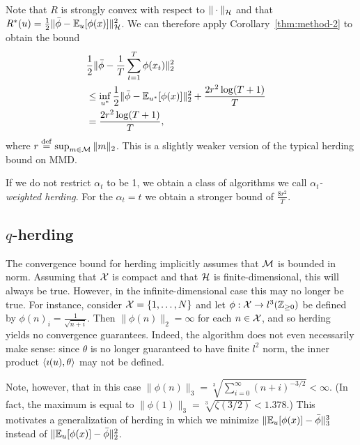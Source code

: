 \documentclass[paper.tex]{subfiles}
\begin{document}
Note that $R$ is strongly convex with respect to $\|\cdot\|_{\mathcal{H}}$ and that 
$R^*(u) = \frac{1}{2}\|\bar{\phi}-\mathbb{E}_{u}[\phi(x)]\|_{\mathcal{H}}^2$. We can 
therefore apply Corollary~\ref{thm:method-2} to obtain the bound
\begin{align*}
\lefteqn{\frac{1}{2}\|\bar{\phi}-\frac{1}{T}\sum_{t=1}^T \phi(x_t)\|_2^2} \\
 &\leq \inf_{u^*} \frac{1}{2}\|\bar{\phi}-\bE_{u^*}[\phi(x)]\|_2^2 + \frac{2r^2\log(T+1)}{T} \\
 &= \frac{2r^2\log(T+1)}{T},
\end{align*}
where $r \stackrel{\mathrm{def}}{=} \sup_{m \in \mathcal{M}} \|m\|_2$. This is a slightly weaker 
version of the typical herding bound on MMD.

If we do not restrict $\alpha_{t}$ to be 1, we obtain a class of algorithms
we call {\em $\alpha_{t}$-weighted herding}. For the $\alpha_t = t$ we obtain 
a stronger bound of $\frac{8r^2}{T}$.

\subsection{$q$-herding}
\label{sec:infinite-case}

The convergence bound for herding implicitly assumes that 
$\mathcal{M}$ is bounded in norm. Assuming that $\mathcal{X}$ is compact 
and that $\mathcal{H}$ is finite-dimensional, this will always be true. However, in 
the infinite-dimensional case this may no longer be true. 
For instance, consider $\mathcal{X} = \{1,\ldots,N\}$ and let 
$\phi : \mathcal{X} \to l^3(\mathbb{Z}_{\geq 0})$ be
defined by $\phi(n)_i = \frac{1}{\sqrt{n+i}}$. Then 
$\|\phi(n)\|_2 = \infty$ for each $n \in \mathcal{X}$, and so herding 
yields no convergence guarantees. Indeed, the algorithm 
does not even necessarily make sense: since $\theta$ is 
no longer guaranteed to have finite $l^2$ norm, the 
inner product $\left\langle \imath(u), \theta \right\rangle$ may not be defined.

Note, however, that in this case
$\|\phi(n)\|_3 = \sqrt[3]{\sum_{i=0}^{\infty} (n+i)^{-3/2}} < \infty$.
(In fact, the maximum is equal to
$\|\phi(1)\|_3 = \sqrt[3]{\zeta(3/2)} < 1.378$.) This motivates 
a generalization of herding in which we minimize 
$\|\mathbb{E}_{u}[\phi(x)]-\bar{\phi}\|_3^3$ instead of 
$\|\mathbb{E}_{u}[\phi(x)]-\bar{\phi}\|_2^2$.
\end{document}
